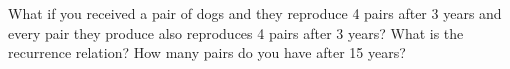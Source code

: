 What if you received a pair of dogs and they reproduce
4 pairs after 3 years and every pair they produce also reproduces
4 pairs after 3 years?
What is the recurrence relation?
How many pairs do you have after 15 years?
